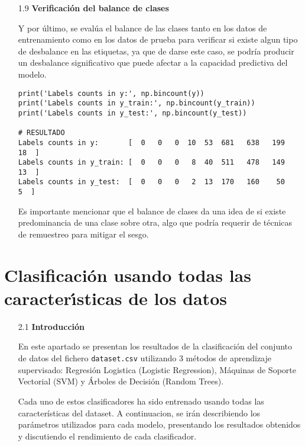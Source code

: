 \documentclass{article}
\begin{document}
\bigskip

\begin{itemize}

\item[1.9]  {\bf Verificaci\'on del balance de clases}

Y por \'ultimo, se eval\'ua el balance de las clases tanto en los datos de entrenamiento como en los datos de prueba para verificar si existe algun tipo de desbalance en las etiquetas, ya que de darse este caso, se podr\'ia producir un desbalance significativo que puede afectar a la capacidad predictiva del modelo.

\begin{tcolorbox}[width=14cm]
\begin{scriptsize}
\begin{verbatim}
print('Labels counts in y:', np.bincount(y))
print('Labels counts in y_train:', np.bincount(y_train))
print('Labels counts in y_test:', np.bincount(y_test))

# RESULTADO
Labels counts in y:       [  0   0   0  10  53  681   638   199   18  ]
Labels counts in y_train: [  0   0   0   8  40  511   478   149   13  ]
Labels counts in y_test:  [  0   0   0   2  13  170   160    50    5  ]
\end{verbatim}
\end{scriptsize}
\end{tcolorbox}

Es importante mencionar que el balance de clases da una idea de si existe predominancia de una clase sobre otra, algo que podr\'ia requerir de t\'ecnicas de remuestreo para mitigar el sesgo.

\end{itemize}


\newpage

\section[2]{Clasificaci\'on usando todas las caracter\'{\i}sticas de los datos}

\bigskip

\begin{itemize}

\item[2.1]  {\bf Introducci\'on}

En este apartado se presentan los resultados de la clasificaci\'on del conjunto de datos del fichero \texttt{dataset.csv} utilizando 3 m\'etodos de aprendizaje supervisado: Regresi\'on Logistica (Logistic Regression), M\'aquinas de Soporte Vectorial (SVM) y \'Arboles de Decisi\'on (Random Trees).

Cada uno de estos clasificadores ha sido entrenado usando todas las caracter\'isticas del dataset. A continuacion, se ir\'an describiendo los par\'ametros utilizados para cada modelo, presentando los resultados obtenidos y discutiendo el rendimiento de cada clasificador.

\end{itemize}
\end{document}
